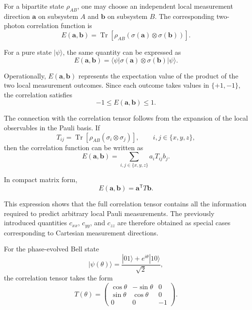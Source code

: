\documentclass[a4paper]{article}
\begin{document}
\medskip

For a bipartite state \(\rho_{AB}\), one may choose an independent local measurement direction \(\mathbf{a}\) on subsystem \(A\) and \(\mathbf{b}\) on subsystem \(B\). The corresponding two-photon correlation function is
\[
E(\mathbf{a},\mathbf{b})
=
\operatorname{Tr}
\left[
\rho_{AB}
\left(
\sigma(\mathbf{a})\otimes\sigma(\mathbf{b})
\right)
\right].
\]

\medskip

For a pure state \(|\psi\rangle\), the same quantity can be expressed as
\[
E(\mathbf{a},\mathbf{b})
=
\langle\psi|
\sigma(\mathbf{a})\otimes\sigma(\mathbf{b})
|\psi\rangle.
\]

\medskip

Operationally, \(E(\mathbf{a},\mathbf{b})\) represents the expectation value of the product of the two local measurement outcomes. Since each outcome takes values in \(\{+1,-1\}\), the correlation satisfies
\[
-1\le E(\mathbf{a},\mathbf{b})\le 1.
\]

\medskip

The connection with the correlation tensor follows from the expansion of the local observables in the Pauli basis. If
\[
T_{ij}
=
\operatorname{Tr}
\left[
\rho_{AB}
\left(
\sigma_i\otimes\sigma_j
\right)
\right],
\qquad
i,j\in\{x,y,z\},
\]
then the correlation function can be written as
\[
E(\mathbf{a},\mathbf{b})
=
\sum_{i,j\in\{x,y,z\}}
a_i T_{ij} b_j.
\]

\medskip

In compact matrix form,
\[
E(\mathbf{a},\mathbf{b})
=
\mathbf{a}^{\mathsf T}T\mathbf{b}.
\]

\medskip

This expression shows that the full correlation tensor contains all the information required to predict arbitrary local Pauli measurements. The previously introduced quantities \(c_{xx}\), \(c_{yy}\), and \(c_{zz}\) are therefore obtained as special cases corresponding to Cartesian measurement directions.

\medskip

For the phase-evolved Bell state
\[
|\psi(\theta)\rangle
=
\frac{|01\rangle+e^{i\theta}|10\rangle}{\sqrt{2}},
\]
the correlation tensor takes the form
\[
T(\theta)
=
\begin{pmatrix}
\cos\theta & -\sin\theta & 0\\
\sin\theta & \cos\theta & 0\\
0 & 0 & -1
\end{pmatrix}.
\]
\end{document}
